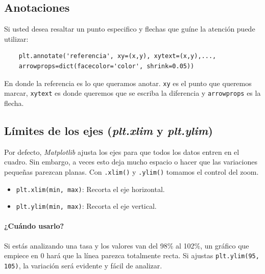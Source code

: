 \subsection{Anotaciones}

Si usted desea resaltar un punto especifico y flechas que guíne la atención puede utilizar:
\begin{verbatim}
    plt.annotate('referencia', xy=(x,y), xytext=(x,y),...,
    arrowprops=dict(facecolor='color', shrink=0.05))
\end{verbatim}

En donde la referencia es lo que queramos anotar. \texttt{xy} es el punto que queremos marcar, \texttt{xytext} es donde queremos que se escriba la diferencia y \texttt{arrowprops} es la flecha.


\subsection{Límites de los ejes (\textit{plt.xlim} y \textit{plt.ylim})}

Por defecto, \textit{Matplotlib} ajusta los ejes para que todos los datos entren en el cuadro. Sin embargo, a veces esto deja mucho espacio o hacer que las variaciones pequeñas parezcan planas. Con \texttt{.xlim()} y \texttt{.ylim()} tomamos el control del zoom.

\begin{itemize}
\item \texttt{plt.xlim(min, max)}: Recorta el eje horizontal.
\item \texttt{plt.ylim(min, max)}: Recorta el eje vertical.
\end{itemize}

\paragraph{¿Cuándo usarlo?}
Si estás analizando una tasa y los valores van del 98\% al 102\%, un gráfico que empiece en 0 hará que la línea parezca totalmente recta. Si ajustas \texttt{plt.ylim(95, 105)}, la variación será evidente y fácil de analizar.

